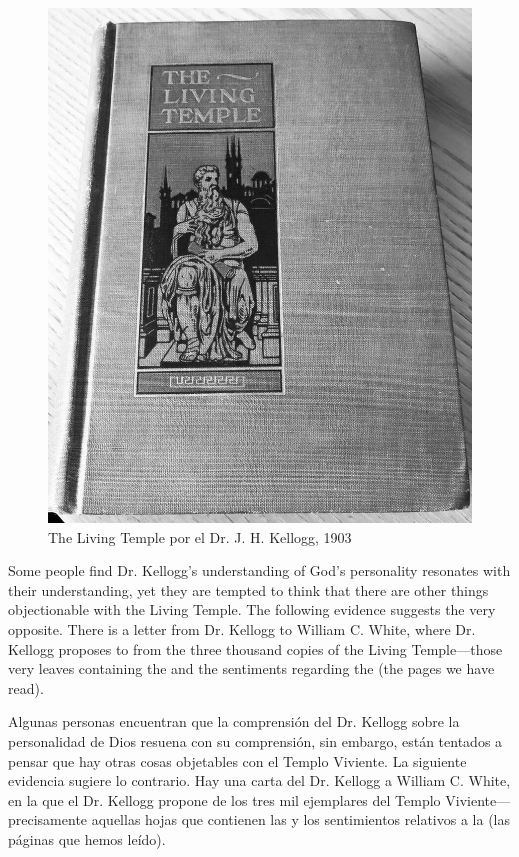 \begin{figure}[hp]
    \centering
    \includegraphics[width=1\linewidth]{images/TLT.jpg}
    \caption*{The Living Temple por el Dr. J. H. Kellogg, 1903}
    \label{fig:tlt}
\end{figure}


Some people find Dr. Kellogg’s understanding of God’s personality resonates with their understanding, yet they are tempted to think that there are other things objectionable with the Living Temple. The following evidence suggests the very opposite. There is a letter from Dr. Kellogg to William C. White, where Dr. Kellogg proposes to  from the three thousand copies of the Living Temple—those very leaves containing the  and the sentiments regarding the  (the pages we have read).


Algunas personas encuentran que la comprensión del Dr. Kellogg sobre la personalidad de Dios resuena con su comprensión, sin embargo, están tentados a pensar que hay otras cosas objetables con el Templo Viviente. La siguiente evidencia sugiere lo contrario. Hay una carta del Dr. Kellogg a William C. White, en la que el Dr. Kellogg propone  de los tres mil ejemplares del Templo Viviente—precisamente aquellas hojas que contienen las  y los sentimientos relativos a la  (las páginas que hemos leído).


